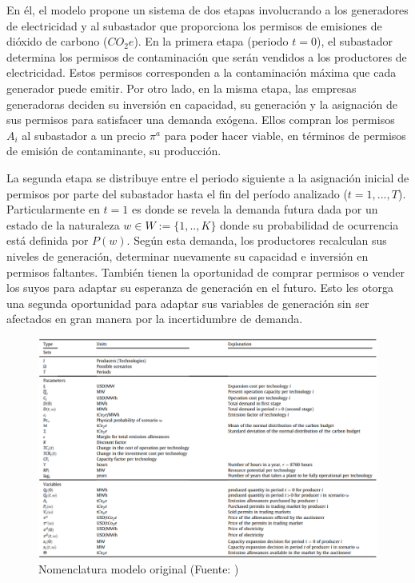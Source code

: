 En él, el modelo propone un sistema de dos etapas involucrando a los generadores de electricidad y al subastador que proporciona los permisos de emisiones de dióxido de carbono ($CO_2 e$). En la primera etapa (periodo $t=0$), el subastador determina los permisos de contaminación que serán vendidos a los productores de electricidad. Estos permisos corresponden a la contaminación máxima que cada generador puede emitir. Por otro lado, en la misma etapa, las empresas generadoras deciden su inversión en capacidad, su generación y la asignación de sus permisos para satisfacer una demanda exógena. Ellos compran los permisos $A_i$ al subastador a un precio $\pi^a$ para poder hacer viable, en términos de permisos de emisión de contaminante, su producción. 
\vspace{2.5mm}

La segunda etapa se distribuye entre el periodo siguiente a la asignación inicial de permisos por parte del subastador hasta el fin del período analizado ($t=1,...,T$). Particularmente en $t=1$ es donde se revela la demanda futura dada por un estado de la naturaleza $w \in W :=\{ 1,..,K\}$ donde su probabilidad de ocurrencia está definida por $P(w)$. Según esta demanda, los productores recalculan sus niveles de generación, determinar nuevamente su capacidad e inversión en permisos faltantes. También tienen la oportunidad de comprar permisos o vender los suyos para adaptar su esperanza de generación en el futuro. Esto les otorga una segunda oportunidad para adaptar sus variables de generación sin ser afectados en gran manera por la incertidumbre de demanda.
\vspace{2.5mm}

\begin{figure}[htp]
    \centering
    \includegraphics[width=15cm]{docs/DocumentoMemoria/images/Tabla amigo.png}
    \caption{Nomenclatura modelo original (Fuente: \protect{})}
    \label{fig:nomenclatura1}
\end{figure}


